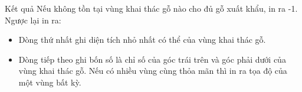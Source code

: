 Kết quả
Nếu không tồn tại vùng khai thác gỗ nào cho đủ gỗ xuất khẩu, in ra -1. Ngược lại in ra:
\begin{itemize}
	\item Dòng thứ nhất ghi diện tích nhỏ nhất có thể của vùng khai thác gỗ.
	\item Dòng tiếp theo ghi bốn số là chỉ số của góc trái trên và góc phải dưới của vùng khai thác gỗ. Nếu có nhiều vùng cùng thỏa mãn thì in ra tọa độ của một vùng bất kỳ.
\end{itemize}